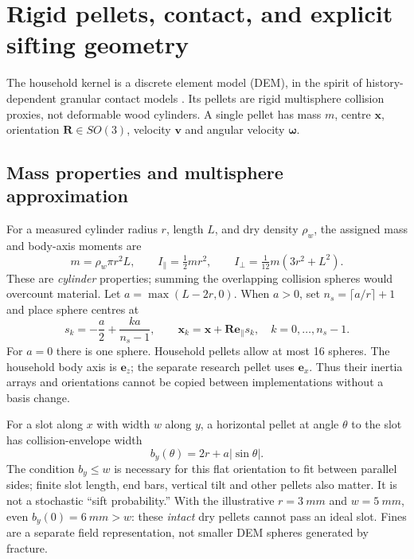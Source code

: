 \section{Rigid pellets, contact, and explicit sifting geometry}
\label{sec:dem}
The household kernel is a discrete element model (DEM), in the spirit of
history-dependent granular contact models \cite{cundall}. Its pellets are rigid
multisphere collision proxies, not deformable wood cylinders. A single pellet
has mass $m$, centre $\mathbf{x}$, orientation $\mathbf{R}\in SO(3)$, velocity
$\mathbf{v}$ and angular velocity $\boldsymbol\omega$.

\subsection{Mass properties and multisphere approximation}
For a measured cylinder radius $r$, length $L$, and dry density $\rho_w$, the
assigned mass and body-axis moments are
\begin{equation}
 m=\rho_w\pi r^2L,\qquad I_\parallel=\tfrac12mr^2,\qquad
 I_\perp=\tfrac1{12}m(3r^2+L^2). \label{eq:pellet-inertia}
\end{equation}
These are \emph{cylinder} properties; summing the overlapping collision spheres
would overcount material. Let $a=\max(L-2r,0)$. When $a>0$, set
$n_s=\lceil a/r\rceil+1$ and place sphere centres at
\begin{equation}
 s_k=-\frac a2+\frac{ka}{n_s-1},\qquad
 \mathbf{x}_k=\mathbf{x}+\mathbf{R}\mathbf{e}_\parallel s_k,
 \quad k=0,\ldots,n_s-1. \label{eq:multisphere}
\end{equation}
For $a=0$ there is one sphere. Household pellets allow at most 16 spheres.
The household body axis is $\mathbf{e}_z$; the separate research pellet uses
$\mathbf{e}_x$. Thus their inertia arrays and orientations cannot be copied
between implementations without a basis change.

For a slot along $x$ with width $w$ along $y$, a horizontal pellet at angle
$\theta$ to the slot has collision-envelope width
\begin{equation}
 b_y(\theta)=2r+a|\sin\theta|. \label{eq:slot-envelope}
\end{equation}
The condition $b_y\leq w$ is necessary for this flat orientation to fit between
parallel sides; finite slot length, end bars, vertical tilt and other pellets
also matter. It is not a stochastic ``sift probability.'' With the illustrative
$r=\SI{3}{mm}$ and $w=\SI{5}{mm}$, even $b_y(0)=\SI{6}{mm}>w$:
these \emph{intact} dry pellets cannot pass an ideal slot. Fines are a separate
field representation, not smaller DEM spheres generated by fracture.

